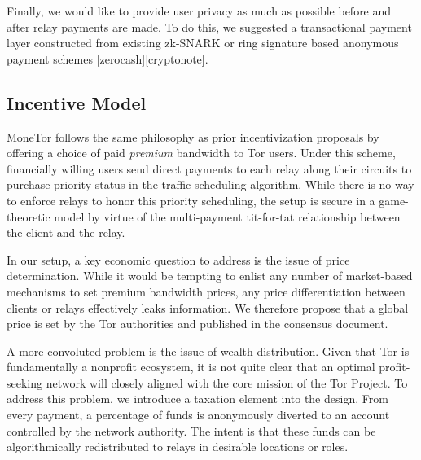 Finally, we would like to provide user privacy as much as possible before and
after relay payments are made. To do this, we suggested a transactional payment
layer constructed from existing zk-SNARK or ring signature based anonymous
payment schemes [zerocash][cryptonote].

\subsection{Incentive Model}
MoneTor follows the same philosophy as prior incentivization proposals by
offering a choice of paid \emph{premium} bandwidth to Tor users. Under this
scheme, financially willing users send direct payments to each relay along their
circuits to purchase priority status in the traffic scheduling
algorithm. While there is no way to enforce relays to honor this priority
scheduling, the setup is secure in a game-theoretic model by virtue of the
multi-payment tit-for-tat relationship between the client and the relay.

In our setup, a key economic question to address is the issue of price
determination. While it would be tempting to enlist any number of market-based
mechanisms to set premium bandwidth prices, any price differentiation between
clients or relays effectively leaks information. We therefore propose that a
global price is set by the Tor authorities and published in the consensus
document.

A more convoluted problem is the issue of wealth distribution. Given that Tor is
fundamentally a nonprofit ecosystem, it is not quite clear that an optimal
profit-seeking network will closely aligned with the core mission of the Tor
Project. To address this problem, we introduce a taxation element into the
design. From every payment, a percentage of funds is anonymously diverted to an
account controlled by the network authority. The intent is that these funds can
be algorithmically redistributed to relays in desirable locations or roles.